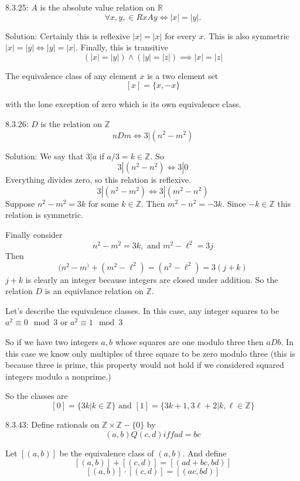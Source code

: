 \documentclass[16 pt]{amsart}
\theoremstyle{definition}
\theoremstyle{remark}
\numberwithin{equation}{subsection}
\newcommand{\R}{\mathbb{R}}
\newcommand{\Z}{\mathbb{Z}}
\begin{document}
\newpage



8.3.25: $A$ is the absolute value relation on $\R$
\[
\forall x,y,\in R xAy \iff |x|=|y|.
\]


\vspace{1in}

Solution: Certainly this is reflexive $|x|=|x|$ for every $x$.
This is also symmetric $|x|=|y| \iff |y|=|x|$.
Finally, this is transitive
\[
(|x|=|y|) \wedge (|y|=|z|) \implies |x|=|z|
\]


The equivalence class of any element $x$ is a two element set
\[
[x] = \{x,-x\}
\]

with the lone exception of zero which is its own equivalence class.

\newpage


8.3.26: $D$ is the relation on $\Z$
\[
nDm \iff 3|(n^2-m^2)
\]

\vspace{1in}

Solution: We say that $3|a$ if $a/3 = k \in\Z$.
So
\[
3|(n^2-n^2) \iff 3|0
\] 
Everything divides zero, so this relation is reflexive.
\[
3|(n^2-m^2) \iff 3|(m^2-n^2)
\]
Suppose $n^2-m^2 = 3k$ for some $k\in\Z$.  Then $m^2-n^2 = -3k$.  Since $-k\in\Z$ this relation is symmetric.

Finally consider
\[
n^2-m^2 = 3k, \text{ and } m^2-\ell^2 = 3j
\]
Then 
\[
(n^2-m^)+(m^2-\ell^2) = (n^2-\ell^2) = 3(j+k)
\]
$j+k$ is clearly an integer because integers are closed under addition.  So the relation $D$ is an equivlance relation on $\Z$.

Let's describe the equivalence classes.  In this case, any integer squares to be $a^2 \equiv 0 \mod{3}$ or $a^2 \equiv 1 \mod{3}$

So if we have two integers $a,b$ whose squares are one modulo three then $aDb$.  In this case we know only multiples of three square to be zero modulo three (this is because three is prime, this property would not hold if we considered squared integers modulo a nonprime.)

So the classes are
\[
[0] = \{3k|k\in\Z\} \text{ and } [1] = \{3k+1,3\ell+2|k,\ell\in\Z \}
\]


\newpage


8.3.43: Define rationals on $\Z\times\Z-\{0\}$ by 
\[
(a,b)Q(c,d) iff ad=bc
\]


Let $[(a,b)]$ be the equivalence class of $(a,b)$.
And define
\[
[(a,b)] + [(c,d)] = [(ad+bc,bd)]
\]
\[
[(a,b)]\cdot[(c,d)] = [(ac,bd)]
\]
\end{document}
